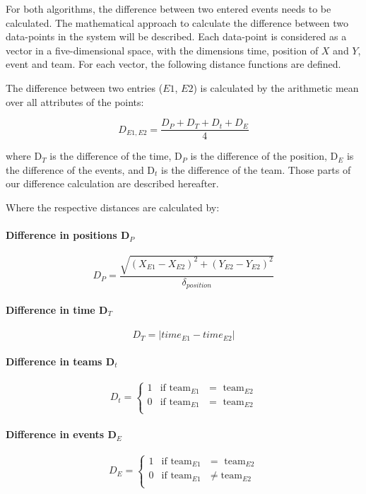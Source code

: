For both algorithms, the difference between two entered events needs to be calculated.
The mathematical approach to calculate the difference between two data-points in the system will be described. Each data-point is considered as a vector in a five-dimensional space, with the dimensions time, position of $X$ and $Y$, event and team. For each vector, the following distance functions are defined.

The difference between two entries ($E1$, $E2$) is calculated by the arithmetic mean over all attributes of the points:

\begin{equation}\label{eq:Distance_points}
	D_{E1,E2}=\frac{D_{P} + D_{T} + D_{t} + D_{E}}{4}
\end{equation}

where D$_{T}$ is the difference of the time, D$_{P}$ is the difference of the position, D$_{E}$ is the difference of the events, and D$_{t}$ is the difference of the team. Those parts of our difference calculation are described hereafter.
\newline


Where the respective distances are calculated by:

\paragraph{Difference in positions D$_{P}$}
$$		D_{P}= \frac{\sqrt{(X_{E1} - X_{E2})^2 + (Y_{E2} - Y_{E2})^2}}{\delta_{position}}
$$		
		
\paragraph{Difference in time D$_{T}$}

$$		D_{T} = |time_{E1} - time_{E2}| $$

\paragraph{Difference in teams D$_{t}$}
$$		D_{t} =
		\begin{cases}
			1	& \text{if team$_{E1}$ } = \text{ team$_{E2}$} \\
			0	& \text{if team$_{E1}$ } = \text{ team$_{E2}$} \\
		\end{cases}
$$

\paragraph{Difference in events D$_{E}$}
$$		D_{E} =
		\begin{cases}
			1	& \text{if team$_{E1}$ } = \text{ team$_{E2}$} \\
			0	& \text{if team$_{E1}$ } \neq \text{team$_{E2}$} \\
		\end{cases}
$$

